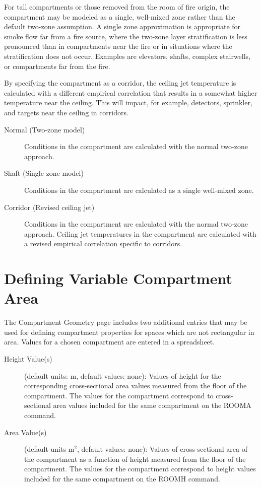 For tall compartments or those removed from the room of fire origin, the compartment may be modeled as a single, well-mixed zone rather than the default two-zone assumption. A single zone approximation is appropriate for smoke flow far from a fire source, where the two-zone layer stratification is less pronounced than in compartments near the fire or in situations where the stratification does not occur. Examples are elevators, shafts, complex stairwells, or compartments far from the fire.

By specifying the compartment as a corridor, the ceiling jet temperature is calculated with a different empirical correlation that results in a somewhat higher temperature near the ceiling.  This will impact, for example, detectors, sprinkler, and targets near the ceiling in corridors.

\begin{description}
\item[Normal (Two-zone model)] Conditions in the compartment are calculated with the normal two-zone approach.

\item[Shaft (Single-zone model)] Conditions in the compartment are calculated as a single well-mixed zone.

\item[Corridor (Revised ceiling jet)] Conditions in the compartment are calculated with the normal two-zone approach. Ceiling jet temperatures in the compartment are calculated with a revised empirical correlation specific to corridors.
\end{description}


\section{Defining Variable Compartment Area}

The Compartment Geometry page includes two additional entries that may be used for defining compartment properties for spaces which are not rectangular in area.  Values for a chosen compartment are entered in a spreadsheet.

\begin{description}
\item[Height Value(s)] (default units: m, default values: none): Values of height for the corresponding cross-sectional area values measured from the floor of the compartment. The values for the compartment correspond to cross-sectional area values included for the same compartment on the ROOMA command.

\item[Area Value(s)] (default units m$^2$, default values: none): Values of cross-sectional area of the compartment as a function of height measured from the floor of the compartment. The values for the compartment correspond to height values included for the same compartment on the ROOMH command.
\end{description}

